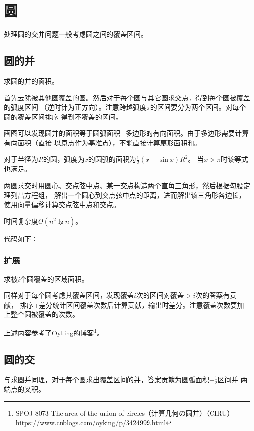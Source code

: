 \section{圆}
处理圆的交并问题一般考虑圆之间的覆盖区间。
\subsection{圆的并}
求圆的并的面积。

首先去除被其他圆覆盖的圆。然后对于每个圆与其它圆求交点，得到每个圆被覆盖的弧度区间
（逆时针为正方向）。注意跨越弧度$\pi$的区间要分为两个区间。对每个圆的覆盖区间排序
得到不覆盖的区间。

画图可以发现圆并的面积等于圆弧面积+多边形的有向面积。由于多边形需要计算有向面积（直接
以原点作为基准点），不能直接计算扇形面积和。

对于半径为$R$的圆，弧度为$x$的圆弧的面积为$\frac{1}{2}(x-\sin x)R^2$。
当$x> \pi$时该等式也满足。

两圆求交时用圆心、交点弦中点、某一交点构造两个直角三角形，然后根据勾股定理列出方程组，
解出一个圆心到交点弦中点的距离，进而解出该三角形各边长，使用向量偏移计算交点弦中点和交点。

时间复杂度$O(n^2 \lg n)$。

代码如下：


\subsubsection{扩展}
求被$i$个圆覆盖的区域面积。

同样对于每个圆考虑其覆盖区间，发现覆盖$i$次的区间对覆盖$>i$次的答案有贡献，
排序+差分统计区间覆盖次数后计算贡献，输出时差分。注意覆盖次数要加上整个圆被覆盖的次数。



上述内容参考了Oyking的博客\footnote{
	SPOJ 8073 The area of the union of circles（计算几何の圆并）（CIRU）
	\url{https://www.cnblogs.com/oyking/p/3424999.html}
}。
\subsection{圆的交}
与求圆并同理，对于每个圆求出覆盖区间的并，答案贡献为圆弧面积+$\frac{1}{2}$区间并
两端点的叉积。
